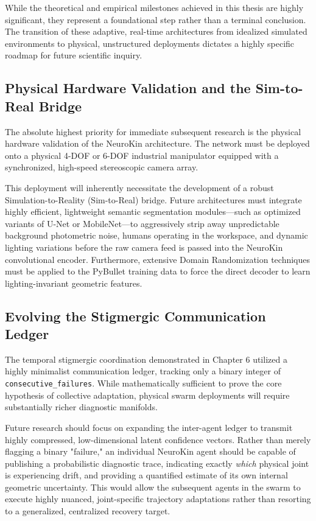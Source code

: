 \documentclass[12pt,a4paper,oneside]{report}
\begin{document}
While the theoretical and empirical milestones achieved in this thesis are highly significant, they represent a foundational step rather than a terminal conclusion. The transition of these adaptive, real-time architectures from idealized simulated environments to physical, unstructured deployments dictates a highly specific roadmap for future scientific inquiry.

\subsection{Physical Hardware Validation and the Sim-to-Real Bridge}

The absolute highest priority for immediate subsequent research is the physical hardware validation of the NeuroKin architecture. The network must be deployed onto a physical 4-DOF or 6-DOF industrial manipulator equipped with a synchronized, high-speed stereoscopic camera array. 

This deployment will inherently necessitate the development of a robust Simulation-to-Reality (Sim-to-Real) bridge. Future architectures must integrate highly efficient, lightweight semantic segmentation modules—such as optimized variants of U-Net or MobileNet—to aggressively strip away unpredictable background photometric noise, humans operating in the workspace, and dynamic lighting variations before the raw camera feed is passed into the NeuroKin convolutional encoder. Furthermore, extensive Domain Randomization techniques must be applied to the PyBullet training data to force the direct decoder to learn lighting-invariant geometric features.

\subsection{Evolving the Stigmergic Communication Ledger}

The temporal stigmergic coordination demonstrated in Chapter 6 utilized a highly minimalist communication ledger, tracking only a binary integer of \texttt{consecutive\_failures}. While mathematically sufficient to prove the core hypothesis of collective adaptation, physical swarm deployments will require substantially richer diagnostic manifolds.

Future research should focus on expanding the inter-agent ledger to transmit highly compressed, low-dimensional latent confidence vectors. Rather than merely flagging a binary "failure," an individual NeuroKin agent should be capable of publishing a probabilistic diagnostic trace, indicating exactly \textit{which} physical joint is experiencing drift, and providing a quantified estimate of its own internal geometric uncertainty. This would allow the subsequent agents in the swarm to execute highly nuanced, joint-specific trajectory adaptations rather than resorting to a generalized, centralized recovery target.
\end{document}
